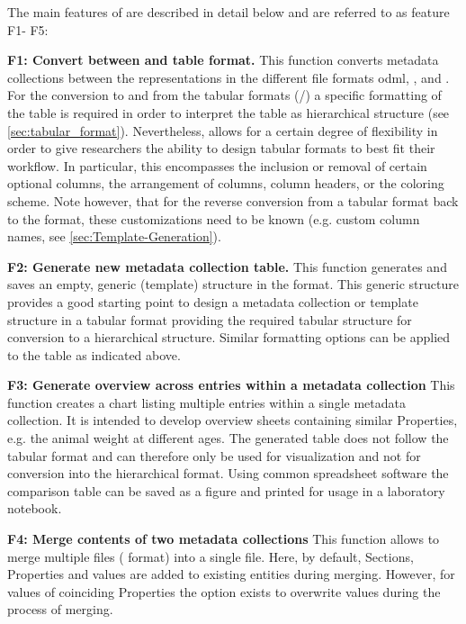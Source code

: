 \def\fconvert{F1}
\def\fgenerate{F2} 
\def\fcompare{F3}
\def\fmerge{F4}
\def\ffilter{F5} 

The main features of  are described in detail below and are referred to as feature \fconvert - \ffilter:


\textbf{\fconvert: Convert between  and table format.}
This function converts metadata collections between the representations in the different file formats odml, , and . For the conversion to and from the tabular formats (/) a specific formatting of the table is required in order to interpret the table as hierarchical  structure (see \cref{sec:tabular_format}). Nevertheless,  allows for a certain degree of flexibility in order to give researchers the ability to design tabular formats to best fit their workflow. In particular, this encompasses the inclusion or removal of certain optional columns, the arrangement of columns, column headers, or the coloring scheme. Note however, that for the reverse conversion from a tabular format back to the  format, these customizations need to be known (e.g. custom column names, see \cref{sec:Template-Generation}).

\textbf{\fgenerate: Generate new metadata collection table.} This function generates and saves an empty, generic (template)  structure in the  format. This generic structure provides a good starting point to design a metadata collection or template structure in a tabular format providing the required tabular structure for conversion to a hierarchical  structure. Similar formatting options can be applied to the table as indicated above.

\textbf{\fcompare: Generate overview across entries within a metadata collection} This function creates a chart listing multiple entries within a single metadata collection. It is intended to develop overview sheets containing similar Properties, e.g. the animal weight at different ages. The generated table does not follow the tabular  format and can therefore only be used for visualization and not for conversion into the hierarchical  format. Using common spreadsheet software the comparison table can be saved as a figure and printed for usage in a laboratory notebook.

\textbf{\fmerge: Merge contents of two metadata collections} This function allows to merge multiple files ( format) into a single file. Here, by default, Sections, Properties and values are added to existing entities during merging. However, for values of coinciding Properties the option exists to overwrite values during the process of merging.

